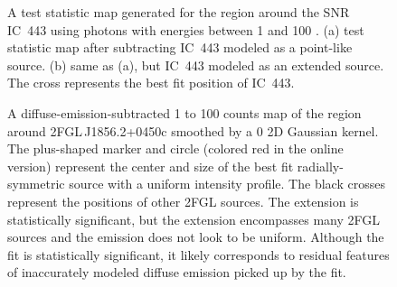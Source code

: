 \documentclass[12pt,preprint]{aastex}
\newif\ifcolorfigure
\newcommand{\gev}{\text{GeV}\xspace}
\begin{document}
\begin{figure}
  \ifcolorfigure
    \plotone{ic443_plots/res_tsmap_ic443_color.eps}
    \else
    \fi

  \caption{
  A test statistic map generated for the region around the SNR 
  IC~443 using 
  photons with energies between
  1 \gev and 100 \gev.  (a) test statistic map after
  subtracting IC~443 modeled as a point-like source. (b) same as (a), but
  IC~443 modeled as an extended source. The cross represents the best
  fit position of IC~443.
  }
  \label{res_tsmaps}
\end{figure}

\clearpage
\begin{figure}
    \ifcolorfigure
    \plotone{source_plots/example_bad_fit_color.eps}
    \else
    \fi
    \caption{
    A diffuse-emission-subtracted 1 \gev to 100 \gev counts map of the
    region around 2FGL\,J1856.2+0450c smoothed by a 0 2D Gaussian
    kernel. The plus-shaped marker and circle (colored red in
    the online version) represent the center and size of the best fit
    radially-symmetric source with a uniform intensity profile.  The black
    crosses represent the positions of other 2FGL sources.  The extension
    is statistically significant, but the extension encompasses many 2FGL
    sources and the emission does not look to be uniform. Although
    the fit is statistically significant, it likely corresponds to
    residual features of inaccurately modeled diffuse emission picked
    up by the fit. 
    }
    \label{example_bad_fit}
\end{figure}
\end{document}
